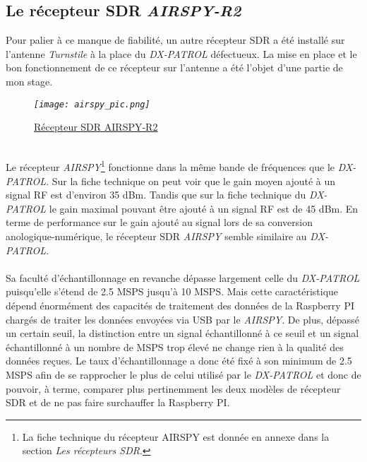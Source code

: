\documentclass[12pt,fleqn]{book} %
\begin{document}
\subsection{Le récepteur SDR \emph{AIRSPY-R2}}
Pour palier à ce manque de fiabilité, un autre récepteur SDR a été installé sur l'antenne \emph{Turnstile} à la place du \emph{DX-PATROL} défectueux. La mise en place et le bon fonctionnement de ce récepteur sur l'antenne a été l'objet d'une partie de mon stage.
\begin{figure}[H]
	\centering
	\itshape
	\texttt{[image: airspy\_pic.png]}
	\caption{\label{airspy_pic} \underline{Récepteur SDR AIRSPY-R2}}
\end{figure}
~\\Le récepteur \emph{AIRSPY}\footnote{La fiche technique du récepteur AIRSPY est donnée en annexe dans la section \emph{Les récepteurs SDR}.} fonctionne dans la même bande de fréquences que le \emph{DX-PATROL}. Sur la fiche technique on peut voir que le gain moyen ajouté à un signal RF est d'environ 35 dBm. Tandis que sur la fiche technique du \emph{DX-PATROL} le gain maximal pouvant être ajouté à un signal RF est de 45 dBm.
En terme de performance sur le gain ajouté au signal lors de sa conversion anologique-numérique, le récepteur SDR \emph{AIRSPY} semble similaire au \emph{DX-PATROL}.
~\\\\Sa faculté d'échantillonnage en revanche dépasse largement celle du \emph{DX-PATROL} puisqu'elle s'étend de 2.5 MSPS jusqu'à 10 MSPS. Mais cette caractéristique dépend énormément des capacités de traitement des données de la Raspberry PI chargés de traiter les données envoyées via USB par le \emph{AIRSPY}. De plus, dépassé un certain seuil, la distinction entre un signal échantillonné à ce seuil et un signal échantillonné à un nombre de MSPS trop élevé ne change rien à la qualité des données reçues.
Le taux d'échantillonnage a donc été fixé à son minimum de 2.5 MSPS afin de se rapprocher le plus de celui utilisé par le \emph{DX-PATROL} et donc de pouvoir, à terme, comparer plus pertinemment les deux modèles de récepteur SDR et de ne pas faire surchauffer la Raspberry PI.
\end{document}

